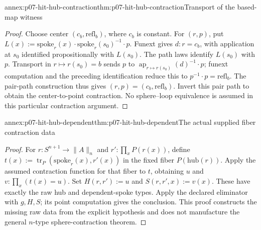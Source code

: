 \begin{annexitem}{annex:p07-hit-hub-contraction}{thm:p07-hit-hub-contraction}{Transport of the based-map witness}
\begin{proof}
Choose center \((c_b,\mathrm{refl}_b)\), where \(c_b\) is constant.
For \((r,p)\), put
\(L(x):=\mathrm{spoke}_r(x)\cdot\mathrm{spoke}_r(s_0)^{-1}\cdot p\).
Funext gives \(d:r=c_b\), with application at \(s_0\) identified
propositionally with \(L(s_0)\). The path laws identify \(L(s_0)\)
with \(p\). Transport in \(r\mapsto r(s_0)=b\) sends \(p\) to
\(\operatorname{ap}_{r\mapsto r(s_0)}(d)^{-1}\cdot p\); funext
computation and the preceding identification reduce this to
\(p^{-1}\cdot p=\mathrm{refl}_b\). The pair-path construction thus
gives \((r,p)=(c_b,\mathrm{refl}_b)\). Invert this pair path to obtain
the center-to-point contraction. No sphere--loop equivalence is assumed
in this particular contraction argument.
\end{proof}
\end{annexitem}

\begin{annexitem}{annex:p07-hit-hub-dependent}{thm:p07-hit-hub-dependent}{The actual supplied fiber contraction data}
\begin{proof}
For \(r:S^{n+1}\to\|A\|_n\) and
\(r':\prod_xP(r(x))\), define
\(t(x):=\operatorname{tr}_P(\mathrm{spoke}_r(x),r'(x))\) in the fixed
fiber \(P(\mathrm{hub}(r))\). Apply the assumed contraction function
for that fiber to \(t\), obtaining \(u\) and
\(v:\prod_x(t(x)=u)\). Set \(H(r,r'):=u\) and
\(S(r,r',x):=v(x)\). These have exactly the raw hub and dependent-spoke
types. Apply the declared eliminator with \(g,H,S\); its point
computation gives the conclusion. This proof constructs the missing raw
data from the explicit hypothesis and does not manufacture the general
\(n\)-type sphere-contraction theorem.
\end{proof}
\end{annexitem}

